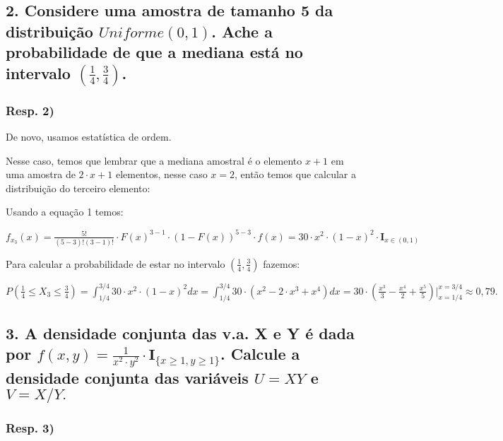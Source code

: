 \documentclass[portuguese]{article}
\begin{document}
\subsection*{\textcompwordmark{}}


\subsection*{\textmd{2. Considere uma amostra de tamanho 5 da distribuição $Uniforme(0,1)$.
Ache a probabilidade de que a mediana está no intervalo $(\frac{1}{4},\frac{3}{4})$. }}


\subsubsection*{\textmd{Resp}. \textmd{2)}}

De novo, usamos estatística de ordem.

Nesse caso, temos que lembrar que a mediana amostral é o elemento
$x+1$ em uma amostra de $2\cdot x+1$ elementos, nesse caso $x=2$,
então temos que calcular a distribuição do terceiro elemento:

Usando a equação 1 temos:

$f_{x_{3}}(x)=\frac{5!}{(5-3)!(3-1)!}\cdot F(x)^{3-1}\cdot(1-F(x))^{5-3}\cdot f(x)=30\cdot x^{2}\cdot(1-x)^{2}\cdot\mathbf{I}_{x\in(0,1)}$

Para calcular a probabilidade de estar no intervalo $(\frac{1}{4},\frac{3}{4})$
fazemos:

$P(\frac{1}{4}\leq X_{3}\leq\frac{3}{4})=\int_{1/4}^{3/4}30\cdot x^{2}\cdot(1-x)^{2}dx=\int_{1/4}^{3/4}30\cdot(x^{2}-2\cdot x^{3}+x^{4})dx=30\cdot(\frac{x^{3}}{3}-\frac{x^{4}}{2}+\frac{x^{5}}{5})|_{x=1/4}^{x=3/4}\approx 0,79.$


\subsection*{\textcompwordmark{}}


\subsection*{\textmd{3. A densidade conjunta das v.a. X e Y é dada por $f(x,y)=\frac{1}{x^{2}\cdot y^{2}}\cdot\mathbf{I}_{\{x\ge1,y\ge1\}}$.
Calcule a densidade conjunta das variáveis $U=XY$ e $V=X/Y.$}}


\subsubsection*{\textmd{Resp}. \textmd{3)}}
\end{document}
